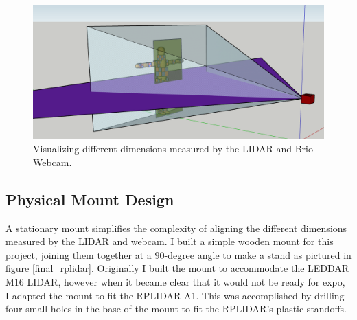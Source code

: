 \documentclass[onecolumn, draftclsnofoot,10pt, compsoc]{IEEEtran}
\makeatletter
\newcommand\captionof[1]{\def\@captype{#1}\caption}
\makeatother
\begin{document}
\begin{singlespace}
		\begin{figure}[H]
			\includegraphics[scale=0.5]{different_dimensions.PNG}
			\captionof{figure}{Visualizing different dimensions measured by the LIDAR and Brio Webcam.}
			\label{dimensions}
		\end{figure}

		\subsection{Physical Mount Design}

		A stationary mount simplifies the complexity of aligning the different dimensions measured by the LIDAR and webcam. 
		I built a simple wooden mount for this project, joining them together at a 90-degree angle to make a stand as pictured in figure \ref{final_rplidar}.
		Originally I built the mount to accommodate the LEDDAR M16 LIDAR, however when it became clear that it would not be ready for expo, I adapted the mount to fit the RPLIDAR A1. 
		This was accomplished by drilling four small holes in the base of the mount to fit the RPLIDAR's plastic standoffs.


\end{singlespace}
\end{document}
